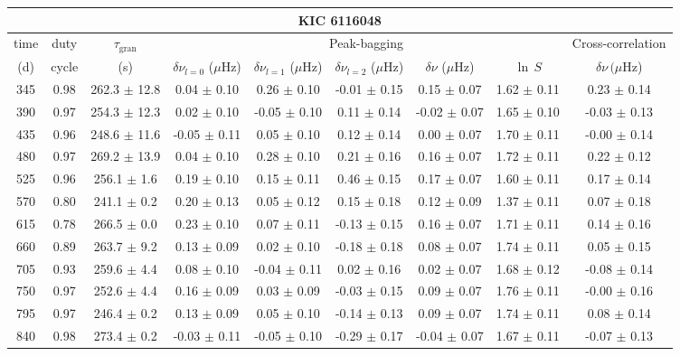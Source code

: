 \documentclass[twocolumn]{aastex61}%
\begin{document}
\begin{table*}[ht]\centering\fontsize{9.}{7.}\selectfont
\begin{tabular}{ccc|ccccc|c}
\multicolumn{9}{c}{KIC 6116048}\\ \hline\hline
time & duty & $\tau_\text{gran}$ &\multicolumn{5}{c|}{Peak-bagging}&Cross-correlation\\
(d)& cycle & (s)&$\delta\nu_{l=0}$ ($\mu$Hz) & $\delta\nu_{l=1}$ ($\mu$Hz) & $\delta\nu_{l=2}$ ($\mu$Hz) & $\delta\nu$ ($\mu$Hz)& $\ln\,S$ & $\delta\nu\,(\mu$Hz)\\\hline
345 & 0.98 & 262.3 $\pm$ 12.8 & 0.04 $\pm$ 0.10 & 0.26 $\pm$ 0.10 & -0.01 $\pm$ 0.15 & 0.15 $\pm$ 0.07 & 1.62 $\pm$ 0.11 & 0.23 $\pm$ 0.14\\
390 & 0.97 & 254.3 $\pm$ 12.3 & 0.02 $\pm$ 0.10 & -0.05 $\pm$ 0.10 & 0.11 $\pm$ 0.14 & -0.02 $\pm$ 0.07 & 1.65 $\pm$ 0.10 & -0.03 $\pm$ 0.13\\
435 & 0.96 & 248.6 $\pm$ 11.6 & -0.05 $\pm$ 0.11 & 0.05 $\pm$ 0.10 & 0.12 $\pm$ 0.14 & 0.00 $\pm$ 0.07 & 1.70 $\pm$ 0.11 & -0.00 $\pm$ 0.14\\
480 & 0.97 & 269.2 $\pm$ 13.9 & 0.04 $\pm$ 0.10 & 0.28 $\pm$ 0.10 & 0.21 $\pm$ 0.16 & 0.16 $\pm$ 0.07 & 1.72 $\pm$ 0.11 & 0.22 $\pm$ 0.12\\
525 & 0.96 & 256.1 $\pm$ 1.6 & 0.19 $\pm$ 0.10 & 0.15 $\pm$ 0.11 & 0.46 $\pm$ 0.15 & 0.17 $\pm$ 0.07 & 1.60 $\pm$ 0.11 & 0.17 $\pm$ 0.14\\
570 & 0.80 & 241.1 $\pm$ 0.2 & 0.20 $\pm$ 0.13 & 0.05 $\pm$ 0.12 & 0.15 $\pm$ 0.18 & 0.12 $\pm$ 0.09 & 1.37 $\pm$ 0.11 & 0.07 $\pm$ 0.18\\
615 & 0.78 & 266.5 $\pm$ 0.0 & 0.23 $\pm$ 0.10 & 0.07 $\pm$ 0.11 & -0.13 $\pm$ 0.15 & 0.16 $\pm$ 0.07 & 1.71 $\pm$ 0.11 & 0.14 $\pm$ 0.16\\
660 & 0.89 & 263.7 $\pm$ 9.2 & 0.13 $\pm$ 0.09 & 0.02 $\pm$ 0.10 & -0.18 $\pm$ 0.18 & 0.08 $\pm$ 0.07 & 1.74 $\pm$ 0.11 & 0.05 $\pm$ 0.15\\
705 & 0.93 & 259.6 $\pm$ 4.4 & 0.08 $\pm$ 0.10 & -0.04 $\pm$ 0.11 & 0.02 $\pm$ 0.16 & 0.02 $\pm$ 0.07 & 1.68 $\pm$ 0.12 & -0.08 $\pm$ 0.14\\
750 & 0.97 & 252.6 $\pm$ 4.4 & 0.16 $\pm$ 0.09 & 0.03 $\pm$ 0.09 & -0.03 $\pm$ 0.15 & 0.09 $\pm$ 0.07 & 1.76 $\pm$ 0.11 & -0.00 $\pm$ 0.16\\
795 & 0.97 & 246.4 $\pm$ 0.2 & 0.13 $\pm$ 0.09 & 0.05 $\pm$ 0.10 & -0.14 $\pm$ 0.13 & 0.09 $\pm$ 0.07 & 1.74 $\pm$ 0.11 & 0.08 $\pm$ 0.14\\
840 & 0.98 & 273.4 $\pm$ 0.2 & -0.03 $\pm$ 0.11 & -0.05 $\pm$ 0.10 & -0.29 $\pm$ 0.17 & -0.04 $\pm$ 0.07 & 1.67 $\pm$ 0.11 & -0.07 $\pm$ 0.13\\

\end{tabular}
\end{table*}
\end{document}

